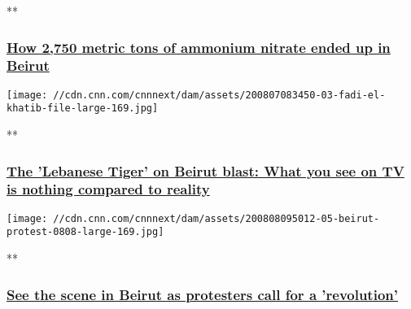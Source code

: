 **

\hypertarget{how-2750-metric-tons-of-ammonium-nitrate-ended-up-in-beirut}{%
\subsubsection{\texorpdfstring{\href{/videos/world/2020/08/06/beirut-lebanon-explosion-ammonium-nitrate-russian-ship-robertson-pkg-intl-ldn-vpx.cnn/video/playlists/around-the-world/}{How
2,750 metric tons of ammonium nitrate ended up in
Beirut}}{How 2,750 metric tons of ammonium nitrate ended up in Beirut}}\label{how-2750-metric-tons-of-ammonium-nitrate-ended-up-in-beirut}}

\href{/videos/sports/2020/08/07/fadi-el-khatib-basketball-hero-lebanon-beirut-explosion-charity-spt-intl-lon-orig.cnn/video/playlists/around-the-world/}{}

\texttt{[image: //cdn.cnn.com/cnnnext/dam/assets/200807083450-03-fadi-el-khatib-file-large-169.jpg]}

**

\hypertarget{the-lebanese-tiger-on-beirut-blast-what-you-see-on-tv-is-nothing-compared-to-reality}{%
\subsubsection{\texorpdfstring{\href{/videos/sports/2020/08/07/fadi-el-khatib-basketball-hero-lebanon-beirut-explosion-charity-spt-intl-lon-orig.cnn/video/playlists/around-the-world/}{The
'Lebanese Tiger' on Beirut blast: What you see on TV is nothing compared
to
reality}}{The 'Lebanese Tiger' on Beirut blast: What you see on TV is nothing compared to reality}}\label{the-lebanese-tiger-on-beirut-blast-what-you-see-on-tv-is-nothing-compared-to-reality}}

\href{/videos/world/2020/08/08/protesters-in-beirut-wedeman-vpx.cnn/video/playlists/around-the-world/}{}

\texttt{[image: //cdn.cnn.com/cnnnext/dam/assets/200808095012-05-beirut-protest-0808-large-169.jpg]}

**

\hypertarget{see-the-scene-in-beirut-as-protesters-call-for-a-revolution-}{%
\subsubsection{\texorpdfstring{\href{/videos/world/2020/08/08/protesters-in-beirut-wedeman-vpx.cnn/video/playlists/around-the-world/}{See
the scene in Beirut as protesters call for a 'revolution'
}}{See the scene in Beirut as protesters call for a 'revolution' }}\label{see-the-scene-in-beirut-as-protesters-call-for-a-revolution-}}

